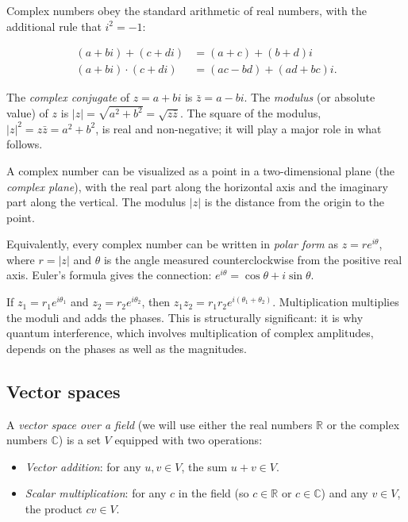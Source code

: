 Complex numbers obey the standard arithmetic of real numbers, with
the additional rule that $i^2 = -1$:

\begin{align}
(a + bi) + (c + di) &= (a+c) + (b+d)i \\
(a + bi) \cdot (c + di) &= (ac - bd) + (ad + bc)i.
\end{align}

The \emph{complex conjugate} of $z = a + bi$ is $\bar{z} = a - bi$.
The \emph{modulus} (or absolute value) of $z$ is
$|z| = \sqrt{a^2 + b^2} = \sqrt{z \bar{z}}$. The square of the
modulus, $|z|^2 = z\bar{z} = a^2 + b^2$, is real and non-negative;
it will play a major role in what follows.

A complex number can be visualized as a point in a two-dimensional
plane (the \emph{complex plane}), with the real part along the
horizontal axis and the imaginary part along the vertical. The
modulus $|z|$ is the distance from the origin to the point.

Equivalently, every complex number can be written in \emph{polar
form} as $z = r e^{i\theta}$, where $r = |z|$ and $\theta$ is the
angle measured counterclockwise from the positive real axis. Euler's
formula gives the connection: $e^{i\theta} = \cos\theta + i\sin\theta$.

\begin{example}
If $z_1 = r_1 e^{i\theta_1}$ and $z_2 = r_2 e^{i\theta_2}$, then
$z_1 z_2 = r_1 r_2 e^{i(\theta_1 + \theta_2)}$. Multiplication
multiplies the moduli and adds the phases. This is structurally
significant: it is why quantum interference, which involves
multiplication of complex amplitudes, depends on the phases as well
as the magnitudes.
\end{example}

\subsection{Vector spaces}

A \emph{vector space over a field} (we will use either the real
numbers $\mathbb{R}$ or the complex numbers $\mathbb{C}$) is a set
$V$ equipped with two operations:

\begin{itemize}[leftmargin=2em]
    \item \emph{Vector addition}: for any $u, v \in V$, the sum
    $u + v \in V$.
    \item \emph{Scalar multiplication}: for any $c$ in the field
    (so $c \in \mathbb{R}$ or $c \in \mathbb{C}$) and any $v \in V$,
    the product $c v \in V$.
\end{itemize}

